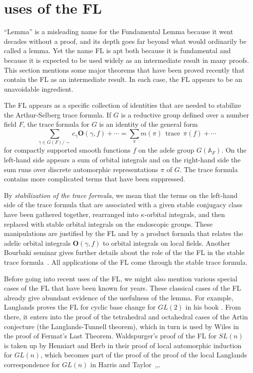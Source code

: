 \documentclass[brochure,english,12pt]{bourbaki}
\theoremstyle{plain}
\def\op#1{{\operatorname{#1}}}
\newcommand{\ring}[1]{\mathbb{#1}}
\def\OO{{\mathbf O}}
\begin{document}
\section{uses of the FL}  \label{sec:uses}

``Lemma'' is a misleading name for the Fundamental Lemma because it
went decades without a proof, and its depth goes far beyond what would
ordinarily be called a lemma.  Yet the name FL is apt both because it
is fundamental and because it is expected to be used widely as an
intermediate result in many proofs.  This section mentions some major
theorems that have been proved recently that contain the FL as an
intermediate result.  In each case, the FL appears to be an
unavoidable ingredient.

The FL appears as a specific collection of identities
that are needed to stabilize the Arthur-Selberg trace formula.  
If $G$ is a reductive group defined over a number field $F$, 
the trace formula for $G$ is an identity of the general form
\[
\sum_{\gamma\in G(F)/\sim} c_\gamma \OO(\gamma,f) +\cdots = 
\sum_\pi m(\pi) \,\op{trace}\, \pi(f) + \cdots
\]
for compactly supported smooth functions $f$ on the adele group
$G(\ring{A}_F)$.  On the left-hand side appears a sum of orbital integrals
and on the right-hand side the sum runs over discrete automorphic
representations $\pi$ of $G$.    The trace formula contains more complicated terms that have
been suppressed.

By {\it stabilization of the trace formula}, we mean that the terms on
the left-hand side of the trace formula that are associated with a
given stable conjugacy class have been gathered together, rearranged
into $\kappa$-orbital integrals, and then replaced with stable orbital
integrals on the endoscopic groups.  These manipulations are justified
by the FL and by a product formula that relates the adelic orbital
integrals $\OO(\gamma,f)$ to orbital integrals on local fields.
Another Bourbaki seminar gives further details about the role of the
the FL in the stable trace formula~\cite{Dat:2004}.  All applications
of the FL come through the stable trace formula.

Before going into recent uses of the FL, we might also mention various
special cases of the FL that have been known for years.  These classical
cases of the FL already give abundant evidence of the usefulness of
the lemma.  For example, Langlands proves the FL for
cyclic base change for $GL(2)$ in his book \cite[Lemma~5.10]{LBC:1980}.
From there, it enters into the proof of the tetrahedral and
octahedral cases of the Artin conjecture (the Langlands-Tunnell theorem),
which in turn is used by Wiles in the proof of Fermat's Last Theorem.
Waldspurger's proof of the FL for $SL(n)$ is taken up by Henniart and Herb in their
proof of local automorphic induction for $GL(n)$, which becomes part of the
proof of the proof of the local Langlands correspondence for $GL(n)$
in Harris and Taylor~\cite{Wald:1991},\cite{Herb:Autoinduct},\cite{Harris:Taylor:local}.  
\end{document}
